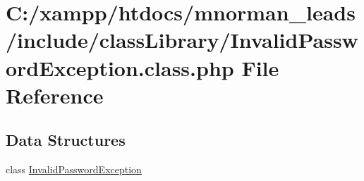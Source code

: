 \hypertarget{_invalid_password_exception_8class_8php}{\section{C\-:/xampp/htdocs/mnorman\-\_\-leads/include/class\-Library/\-Invalid\-Password\-Exception.class.\-php File Reference}
\label{_invalid_password_exception_8class_8php}
}
\subsection*{Data Structures}
\begin{DoxyCompactItemize}
\item 
class \hyperlink{class_invalid_password_exception}{Invalid\-Password\-Exception}
\end{DoxyCompactItemize}
